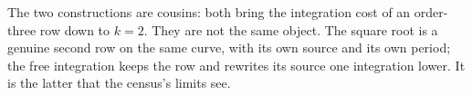 The two constructions are cousins: both bring the integration cost of an
order-three row down to $k=2$.  They are not the same object.  The square root is
a genuine second row on the same curve, with its own source and its own period;
the free integration keeps the row and rewrites its source one integration lower.
It is the latter that the census's limits see.
